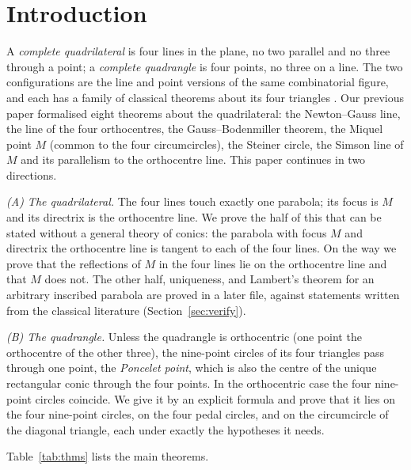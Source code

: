\documentclass[11pt]{article}
\theoremstyle{definition}
\theoremstyle{remark}
\begin{document}
\section{Introduction}

A \emph{complete quadrilateral} is four lines in the plane, no two parallel and no three through a
point; a \emph{complete quadrangle} is four points, no three on a line. The two configurations are
the line and point versions of the same combinatorial figure, and each has a family of classical
theorems about its four triangles \cite{johnson1929,coolidge1916}. Our previous paper
\cite{paperE} formalised eight theorems about the quadrilateral: the Newton--Gauss line, the line of
the four orthocentres, the Gauss--Bodenmiller theorem, the Miquel point $M$ (common to the four
circumcircles), the Steiner circle, the Simson line of $M$ and its parallelism to the orthocentre
line. This paper continues in two directions.

\emph{(A) The quadrilateral.} The four lines touch exactly one parabola; its focus is $M$ and its
directrix is the orthocentre line. We prove the half of this that can be stated without a general
theory of conics: the parabola with focus $M$ and directrix the orthocentre line is tangent to each of
the four lines. On the way we prove that the reflections of $M$ in the four lines lie on the
orthocentre line and that $M$ does not. The other half, uniqueness, and Lambert's theorem for an
arbitrary inscribed parabola are proved in a later file, against statements written from the classical
literature (Section~\ref{sec:verify}).

\emph{(B) The quadrangle.} Unless the quadrangle is orthocentric (one point the orthocentre of the
other three), the nine-point circles of its four triangles pass through one point, the \emph{Poncelet
point}, which is also the centre of the unique rectangular conic through the four points. In the
orthocentric case the four nine-point circles coincide. We give it by an explicit formula and prove that it lies on the four nine-point circles,
on the four pedal circles, and on the circumcircle of the diagonal triangle, each under exactly the
hypotheses it needs.

Table~\ref{tab:thms} lists the main theorems.
\end{document}
